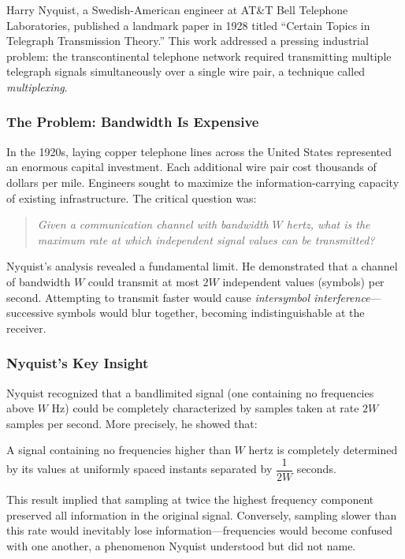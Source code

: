 Harry Nyquist, a Swedish-American engineer at AT\&T Bell Telephone Laboratories, published a landmark paper in 1928 titled ``Certain Topics in Telegraph Transmission Theory.'' This work addressed a pressing industrial problem: the transcontinental telephone network required transmitting multiple telegraph signals simultaneously over a single wire pair, a technique called \textit{multiplexing}.

\subsubsection{The Problem: Bandwidth Is Expensive}

In the 1920s, laying copper telephone lines across the United States represented an enormous capital investment. Each additional wire pair cost thousands of dollars per mile. Engineers sought to maximize the information-carrying capacity of existing infrastructure. The critical question was:

\begin{quote}
\textit{Given a communication channel with bandwidth $W$ hertz, what is the maximum rate at which independent signal values can be transmitted?}
\end{quote}

Nyquist's analysis revealed a fundamental limit. He demonstrated that a channel of bandwidth $W$ could transmit at most $2W$ independent values (symbols) per second. Attempting to transmit faster would cause \textit{intersymbol interference}---successive symbols would blur together, becoming indistinguishable at the receiver.

\subsubsection{Nyquist's Key Insight}

Nyquist recognized that a bandlimited signal (one containing no frequencies above $W$ Hz) could be completely characterized by samples taken at rate $2W$ samples per second. More precisely, he showed that:

\begin{tcolorbox}[colback=blue!5!white,colframe=blue!75!black,sharp corners,title=Nyquist's Sampling Principle (1928)]
A signal containing no frequencies higher than $W$ hertz is completely determined by its values at uniformly spaced instants separated by $\dfrac{1}{2W}$ seconds.
\end{tcolorbox}

This result implied that sampling at twice the highest frequency component preserved all information in the original signal. Conversely, sampling slower than this rate would inevitably lose information---frequencies would become confused with one another, a phenomenon Nyquist understood but did not name.

